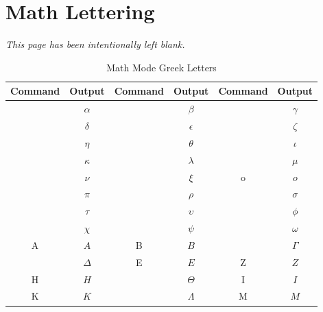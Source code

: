 \chapter{Math Lettering}\label{app:}
\vfill%
\begin{center}
	\Large 
	\textit{This page has been intentionally left blank.}
\end{center}
\vfill%
\clearpage

\begin{table}[p]
	\centering
	\caption{Math Mode Greek Letters}
	\label{tab:greek_letters}
	\begin{tabularx}{\linewidth}{CCCCCC}
		\toprule
			\textbf{Command} & \textbf{Output} & \textbf{Command} & \textbf{Output} & \textbf{Command} & \textbf{Output} \\
		\midrule
			      & \(\alpha\)      &        & \(\beta\)       &       & \(\gamma\)      \\
			      & \(\delta\)      &     & \(\epsilon\)    &        & \(\zeta\)       \\
			        & \(\eta\)        &       & \(\theta\)      &        & \(\iota\)       \\
			      & \(\kappa\)      &      & \(\lambda\)     &          & \(\mu\)         \\
			         & \(\nu\)         &          & \(\xi\)         & {o}              & \(o\)           \\
			         & \(\pi\)         &         & \(\rho\)        &       & \(\sigma\)      \\
			        & \(\tau\)        &     & \(\upsilon\)    &         & \(\phi\)        \\
			        & \(\chi\)        &         & \(\psi\)        &       & \(\omega\)      \\
		\midrule
			A                & \(A\)           & B                & \(B\)           &       & \(\Gamma\)      \\
			      & \(\Delta\)      & E                & \(E\)           & Z                & \(Z\)           \\
			H                & \(H\)           &       & \(\Theta\)      & I                & \(I\)           \\
			K                & \(K\)           &      & \(\Lambda\)     & M                & \(M\)           \\

\end{tabularx}
\end{table}
